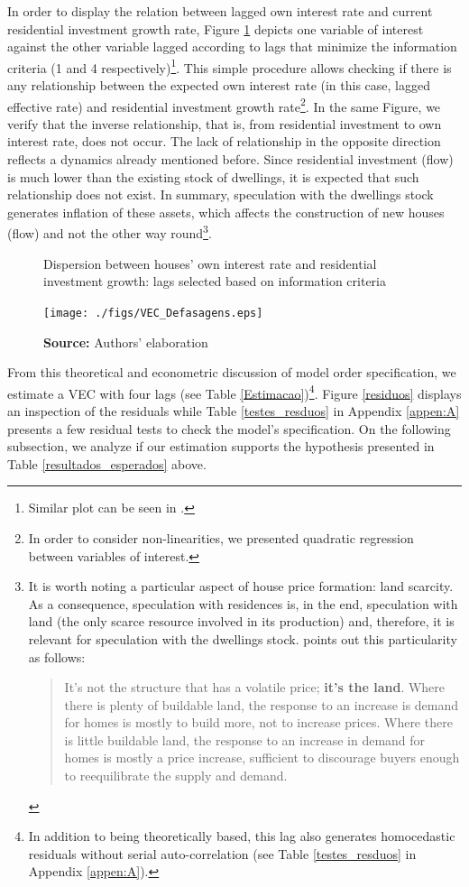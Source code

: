In order to display the relation between lagged own interest rate and current residential investment growth rate, Figure \ref{defasagens} depicts one variable of interest against the other variable lagged according to lags that minimize the information criteria (1 and 4 respectively)\footnote{
	Similar plot can be seen in \textcite[p.~16]{girardi_autonomous_2015}.
}.
This simple procedure allows checking if there is any relationship between the expected own interest rate (in this case, lagged effective rate) and residential investment growth rate\footnote{
	In order to consider non-linearities, we presented quadratic regression between variables of interest.
}.
In the same Figure, we verify that the inverse relationship, that is, from residential investment to own interest rate, does not occur. 
The lack of relationship in the opposite direction reflects a dynamics already mentioned before.
Since residential investment (flow) is much lower than the existing stock of dwellings, it is expected that such relationship does not exist.
In summary, speculation with the dwellings stock generates inflation of these assets, which affects the construction of new houses (flow) and not the other way round\footnote{
	It is worth noting a particular aspect of house price formation: land scarcity. As a consequence, speculation with residences is, in the end, speculation with land (the only scarce resource involved in its production) and, therefore, it is relevant for speculation with the dwellings stock. 
	\textcite[p.~349, emphasis added]{leamer_housing_2007} points out this particularity as follows:
	\begin{quotation}
		It’s not the structure that has a volatile price; \textbf{it's the land}. Where there is plenty of buildable land, the response to an increase is demand for homes is mostly to build more, not to increase prices. Where there is little buildable land, the response to an increase in demand for homes is mostly a price increase, sufficient to discourage buyers enough to reequilibrate the supply and demand.
	\end{quotation}
}.


\begin{figure}
	\centering
	\caption{Dispersion between houses' own interest rate and residential investment growth: lags selected based on information criteria}
	\label{defasagens}
	\texttt{[image: ./figs/VEC\_Defasagens.eps]}
	\caption*{\textbf{Source:} Authors' elaboration}
\end{figure}


From this theoretical and econometric discussion of model order specification, we estimate a VEC with four lags (see Table \ref{Estimacao})\footnote{
	In addition to being theoretically based, this lag also generates homocedastic residuals without serial auto-correlation (see Table \ref{testes_resduos} in Appendix \ref{appen:A}).
}. 
Figure \ref{residuos} displays an inspection of the residuals while Table \ref{testes_resduos} in Appendix \ref{appen:A} presents a few residual tests to check the model's specification.
On the following subsection, we analyze if our estimation supports the hypothesis presented in Table \ref{resultados_esperados} above.  



